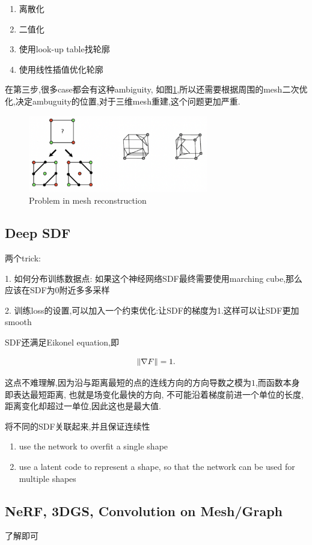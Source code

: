 \begin{enumerate}
    \item 离散化
    \item 二值化
    \item 使用look-up table找轮廓
    \item 使用线性插值优化轮廓
\end{enumerate}

在第三步,很多case都会有这种ambiguity, 如图\ref{fig:mesh reconstruction},所以还需要根据周围的mesh二次优化,决定ambuguity的位置,对于三维mesh重建,这个问题更加严重.

\begin{figure}[H]
    \centering
    \includegraphics[width=0.7\textwidth]{figures/holes.png}
    \caption{Problem in mesh reconstruction}
    \label{fig:mesh reconstruction}
\end{figure}

\subsection{Deep SDF}

两个trick:

1. 如何分布训练数据点: 如果这个神经网络SDF最终需要使用marching cube,那么应该在SDF为0附近多多采样

2. 训练loss的设置,可以加入一个约束优化:让SDF的梯度为1.这样可以让SDF更加smooth

SDF还满足Eikonel equation,即

\begin{equation}
    \left \Vert \nabla F \right \Vert = 1.
\end{equation}

这点不难理解,因为沿与距离最短的点的连线方向的方向导数之模为$1$,而函数本身即表达最短距离, 也就是场变化最快的方向,
不可能沿着梯度前进一个单位的长度,距离变化却超过一单位,因此这也是最大值.

将不同的SDF关联起来,并且保证连续性\cite{Park2019CVPR}

\begin{enumerate}
    \item  use the network to overfit a single shape
    \item use a latent code to represent a shape, so that the
    network can be used for multiple shapes
\end{enumerate}

\subsection{NeRF, 3DGS, Convolution on Mesh/Graph}

了解即可